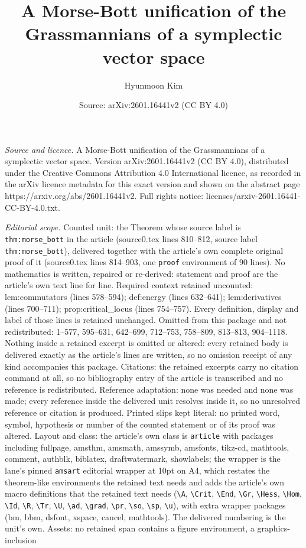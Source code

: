 \documentclass[10pt,a4paper]{amsart}
\title[A Morse-Bott unification of the Grassmannians of a symplecti]{A Morse-Bott unification of the Grassmannians of a symplectic vector space}
\author{Hyunmoon Kim}
\date{Source: arXiv:2601.16441v2 (CC BY 4.0)}
\begin{document}
\maketitle

\noindent\emph{Source and licence.} A Morse-Bott unification of the Grassmannians of a symplectic vector space. Version arXiv:2601.16441v2 (CC BY 4.0), distributed under the Creative Commons Attribution 4.0 International licence, as recorded in the arXiv licence metadata for this exact version and shown on the abstract page https://arxiv.org/abs/2601.16441v2. Full rights notice: licenses/arxiv-2601.16441-CC-BY-4.0.txt.\par\smallskip

\noindent\textit{Editorial scope.} Counted unit: the Theorem whose source label is \texttt{thm:morse\_bott} in the article (source0.tex lines 810--812, source label \texttt{thm:morse\_bott}), delivered together with the article's own complete original proof of it (source0.tex lines 814--903, one \texttt{proof} environment of 90 lines). No mathematics is written, repaired or re-derived: statement and proof are the article's own text line for line. Required context retained uncounted: lem:commutators (lines 578--594); def:energy (lines 632--641); lem:derivatives (lines 700--711); prop:critical\_locus (lines 754--757). Every definition, display and label of those lines is retained unchanged. Omitted from this package and not redistributed: 1--577, 595--631, 642--699, 712--753, 758--809, 813--813, 904--1118. Nothing inside a retained excerpt is omitted or altered: every retained body is delivered exactly as the article's lines are written, so no omission receipt of any kind accompanies this package. Citations: the retained excerpts carry no citation command at all, so no bibliography entry of the article is transcribed and no reference is redistributed. Reference adaptation: none was needed and none was made; every reference inside the delivered unit resolves inside it, so no unresolved reference or citation is produced. Printed slips kept literal: no printed word, symbol, hypothesis or number of the counted statement or of its proof was altered. Layout and class: the article's own class is \texttt{article} with packages including fullpage, amsthm, amsmath, amssymb, amsfonts, tikz-cd, mathtools, comment, authblk, biblatex, draftwatermark, showlabels; the wrapper is the lane's pinned \texttt{amsart} editorial wrapper at 10pt on A4, which restates the theorem-like environments the retained text needs and adds the article's own macro definitions that the retained text needs (\texttt{\textbackslash A}, \texttt{\textbackslash Crit}, \texttt{\textbackslash End}, \texttt{\textbackslash Gr}, \texttt{\textbackslash Hess}, \texttt{\textbackslash Hom}, \texttt{\textbackslash Id}, \texttt{\textbackslash R}, \texttt{\textbackslash Tr}, \texttt{\textbackslash U}, \texttt{\textbackslash ad}, \texttt{\textbackslash grad}, \texttt{\textbackslash pr}, \texttt{\textbackslash so}, \texttt{\textbackslash sp}, \texttt{\textbackslash u}), with extra wrapper packages (bm, bbm, dsfont, xspace, cancel, mathtools). The delivered numbering is the unit's own. Assets: no retained span contains a figure environment, a graphics-inclusion 
\end{document}
